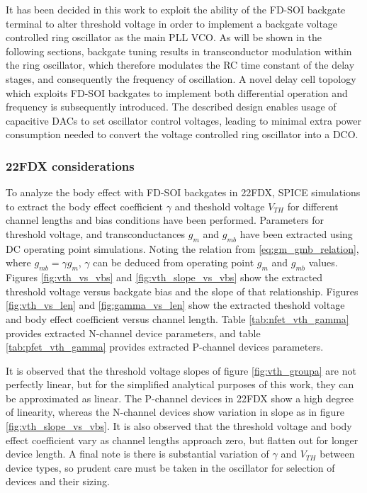 	It has been decided in this work to exploit the ability of the FD-SOI backgate terminal to alter threshold voltage in order to implement a backgate voltage controlled ring oscillator as the main PLL VCO. As will be shown in the following sections, backgate tuning results in transconductor modulation within the ring oscillator, which therefore modulates the RC time constant of the delay stages, and consequently the frequency of oscillation. A novel delay cell topology which exploits FD-SOI backgates to implement both differential operation and frequency is subsequently introduced. The described design enables usage of capacitive DACs to set oscillator control voltages, leading to minimal extra power consumption needed to convert the voltage controlled ring oscillator into a DCO. 




			\FloatBarrier
	\subsubsection{22FDX considerations}
		To analyze the body effect with FD-SOI backgates in 22FDX, SPICE simulations to extract the body effect coefficient $\gamma$ and theshold voltage $V_{TH}$ for different channel lengths and bias conditions have been performed. Parameters for threshold voltage, and transconductances $g_m$ and $g_{mb}$ have been extracted using DC operating point simulations. Noting the relation from \ref{eq:gm_gmb_relation}, where $g_{mb} = \gamma g_{m}$, $\gamma$ can be deduced from operating point $g_m$ and $g_{mb}$ values. Figures \ref{fig:vth_vs_vbs} and \ref{fig:vth_slope_vs_vbs} show the extracted threshold voltage versus backgate bias and the slope of that relationship. Figures \ref{fig:vth_vs_len} and \ref{fig:gamma_vs_len} show the extracted theshold voltage and body effect coefficient versus channel length. Table \ref{tab:nfet_vth_gamma} provides extracted N-channel device parameters, and table \ref{tab:pfet_vth_gamma} provides extracted P-channel devices parameters.

		It is observed that the threshold voltage slopes of figure \ref{fig:vth_groupa} are not perfectly linear, but for the simplified analytical purposes of this work, they can be approximated as linear. The P-channel devices in 22FDX show a high degree of linearity, whereas the N-channel devices show variation in slope as in figure \ref{fig:vth_slope_vs_vbs}. It is also observed that the threshold voltage and body effect coefficient vary as channel lengths approach zero, but flatten out for longer device length. A final note is there is substantial variation of $\gamma$ and $V_{TH}$ between device types, so prudent care must be taken in the oscillator for selection of devices and their sizing.


